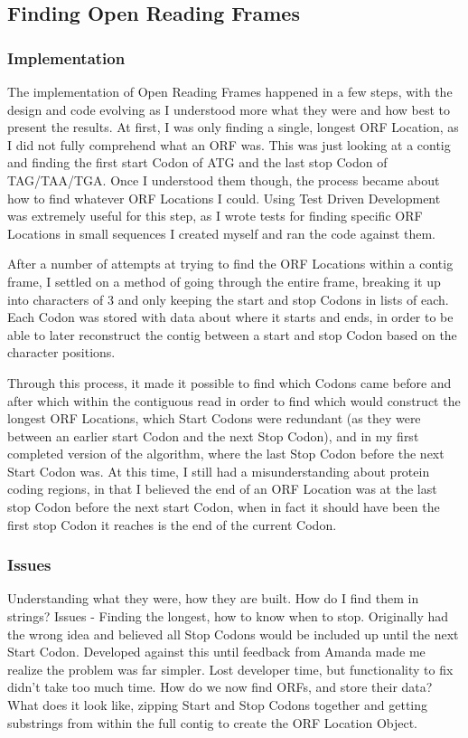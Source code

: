 \subsection{Finding Open Reading Frames}
\subsubsection{Implementation}
The implementation of Open Reading Frames happened in a few steps, with the design and code evolving as I understood more what they were and how best to present the results. At first, I was only finding a single, longest ORF Location, as I did not fully comprehend what an ORF was. This was just looking at a contig and finding the first start Codon of ATG and the last stop Codon of TAG/TAA/TGA. Once I understood them though, the process became about how to find whatever ORF Locations I could. Using Test Driven Development was extremely useful for this step, as I wrote tests for finding specific ORF Locations in small sequences I created myself and ran the code against them.

After a number of attempts at trying to find the ORF Locations within a contig frame, I settled on a method of going through the entire frame, breaking it up into characters of 3 and only keeping the start and stop Codons in lists of each. Each Codon was stored with data about where it starts and ends, in order to be able to later reconstruct the contig between a start and stop Codon based on the character positions.

Through this process, it made it possible to find which Codons came before and after which within the contiguous read in order to find which would construct the longest ORF Locations, which Start Codons were redundant (as they were between an earlier start Codon and the next Stop Codon), and in my first completed version of the algorithm, where the last Stop Codon before the next Start Codon was. At this time, I still had a misunderstanding about protein coding regions, in that I believed the end of an ORF Location was at the last stop Codon before the next start Codon, when in fact it should have been the first stop Codon it reaches is the end of the current Codon. 
\subsubsection{Issues}
Understanding what they were, how they are built. How do I find them in strings? Issues - Finding the longest, how to know when to stop. Originally had the wrong idea and believed all Stop Codons would be included up until the next Start Codon. Developed against this until feedback from Amanda made me realize the problem was far simpler. Lost developer time, but functionality to fix didn't take too much time. How do we now find ORFs, and store their data? What does it look like, zipping Start and Stop Codons together and getting substrings from within the full contig to create the ORF Location Object.

